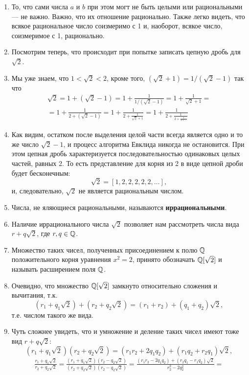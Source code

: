 \begin{enumerate}
\item То, что сами числа $a$ и $b$ при этом могт не быть целыми или рациональными --- не важно. Важно, что их отношение рационально. Также легко видеть, что всякое рациональное число соизмеримо с 1 и, наоборот, всякое число, соизмеримое с 1, рационально.
\item Посмотрим теперь, что происходит при попытке записать цепную дробь для $\sqrt 2$.
\item Мы уже знаем, что $1<\sqrt 2<2$, кроме того, $(\sqrt 2+1)=1/(\sqrt 2-1)$ так что
\begin{multline*}
\sqrt 2 = \boxed{1} + (\sqrt 2-1) = \boxed{1} + \frac{1}{1/(\sqrt 2-1)} = 
\boxed{1} + \frac{1}{\sqrt 2+1} = \\ 
= \boxed{1} + \frac{1}{\boxed{2} + (\sqrt 2-1)} = 
\boxed{1} + \frac{1}{\boxed{2} + \frac{1}{\sqrt 2+1}} = 
\boxed{1} + \frac{1}{\boxed{2} + \frac{1}{\boxed{2} + \frac{1}{\boxed{2} + \dots}}}
\end{multline*}
\item Как видим, остатком после выделения целой части всегда является одно и то же число $\sqrt 2-1$, и процесс алгоритма Евклида никогда не остановится. При этом цепная дробь характеризуется последовательностью одинаковых целых частей, равных 2. То есть представление для корня из 2 в виде цепной дроби будет бесконечным:
$$
\sqrt 2 = [1,2,2,2,2,2,\dots],
$$
и, следовательно, $\sqrt 2$ не является рациональным числом.
\item Числа, не яляющиеся рациональными, называются \textbf{иррациональными}.
\item Наличие иррационального числа $\sqrt 2$ позволяет нам рассмотреть числа вида $r+q\sqrt 2$, где $r,q\in\mathbb Q$.
\item Множество таких чисел, полученных присоединением к полю $\mathbb Q$ положительного корня уравнения $x^2=2$, принято обозначать $\mathbb Q[\sqrt 2]$ и называть расширением поля $\mathbb Q$.
\item Очевидно, что множество $\mathbb Q[\sqrt 2]$ замкнуто относительно сложения и вычитания, т.к.
$$
(r_1+q_1\sqrt 2)+(r_2+q_2\sqrt 2)=(r_1+r_2)+(q_1+q_2)\sqrt 2,
$$
т.е. числом такого же вида.
\item Чуть сложнее увидеть, что и умножение и деление таких чисел имеют тоже вид $r+q\sqrt 2$:
$$
(r_1+q_1\sqrt 2)(r_2+q_2\sqrt 2)=(r_1r_2+2q_1q_2)+(r_1q_2+r_2q_1)\sqrt 2,
$$
\begin{multline*}
\frac{r_1+q_1\sqrt 2}{r_2+q_2\sqrt 2}=\frac{(r_1+q_1\sqrt 2)(r_2-q_2\sqrt 2)}{(r_2+q_2\sqrt 2)(r_2-q_2\sqrt 2)}=
\frac{(r_1r_2-2q_1q_2)+(r_2q_1-r_1q_2)\sqrt 2}{r_2^2-2q_2^2}= \\

\end{multline*}
\end{enumerate}
